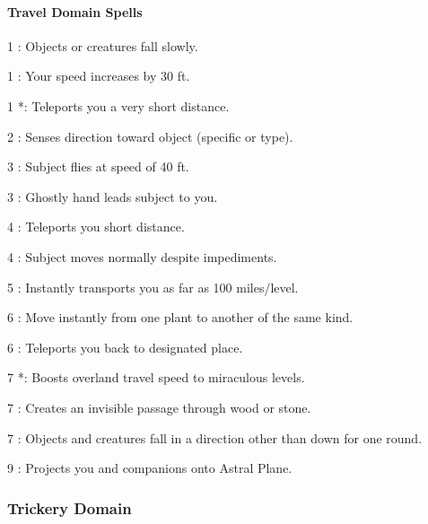 \paragraph{Travel Domain Spells}
\begin{list}{}{\leftmargin=1em}
\item[1] : Objects or creatures fall slowly.
\item[1] : Your speed increases by 30 ft.
\item[1] *: Teleports you a very short distance.
\item[2] : Senses direction toward object (specific or type).
\item[3] : Subject flies at speed of 40 ft.
\item[3] : Ghostly hand leads subject to you.
\item[4] : Teleports you short distance.
\item[4] : Subject moves normally despite impediments.
\item[5] : Instantly transports you as far as 100 miles/level.
\item[6] : Move instantly from one plant to another of the same kind.
\item[6] : Teleports you back to designated place.
\item[7] *: Boosts overland travel speed to miraculous levels.
\item[7] : Creates an invisible passage through wood or stone.
\item[7] : Objects and creatures fall in a direction other than down for one round.
\item[9] : Projects you and companions onto Astral Plane.
\end{list}
\subsubsection{Trickery Domain}
